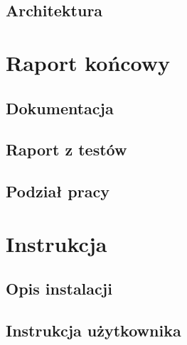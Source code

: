 	\section{Architektura}\label{sec:architektura-zmiany}
	

	\chapter{Raport końcowy}\label{chap:raport końcowy}
	\section{Dokumentacja}\label{sec:dokumentacja}
	
	\section{Raport z testów}\label{sec:raport z testów}
	
	\section{Podział pracy}\label{sec:podzial}
	

	\chapter{Instrukcja}\label{chap:instrukcja}
	\section{Opis instalacji}\label{sec:instrukcja użytkownika}
	
	\section{Instrukcja użytkownika}\label{sec:instrukcja użytkownika}
	

	

	\newpage
	
	\newpage



